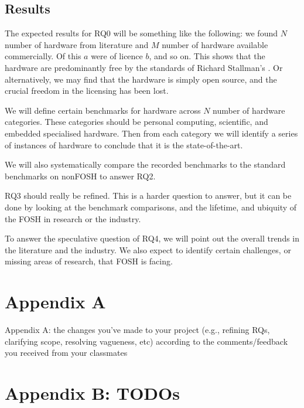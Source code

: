 \documentclass{article}
\begin{document}
\subsection{Results}

The expected results for RQ0 will be something like the following:
we found $N$ number of hardware from literature and $M$ number of hardware available commercially. 
Of this $a$ were of licence $b$, and so on. 
This shows that the hardware are predominantly free by the standards of Richard Stallman's \cite{b0_stallman}.
Or alternatively, we may find that the hardware is simply open source, and the crucial freedom in the licensing has been lost. 

We will define certain benchmarks for hardware across $N$ number of hardware categories. 
These categories should be personal computing, scientific, and embedded specialised hardware. 
Then from each category we will identify a series of instances of hardware to conclude that it is the state-of-the-art.

We will also systematically compare the recorded benchmarks to the standard benchmarks on nonFOSH to answer RQ2. 

RQ3 should really be refined. 
This is a harder question to answer, but it can be done by looking at the benchmark comparisons, and the lifetime, and ubiquity of the FOSH in research or the industry.

To answer the speculative question of RQ4, we will point out the overall trends in the literature and the industry. 
We also expect to identify certain challenges, or missing areas of research, that FOSH is facing.

\section{Appendix A}
Appendix A: the changes you've made to your project 
(e.g., refining RQs, clarifying scope, resolving vagueness, etc) 
according to the comments/feedback you received from your classmates


\section{Appendix B: TODOs}
\end{document}
